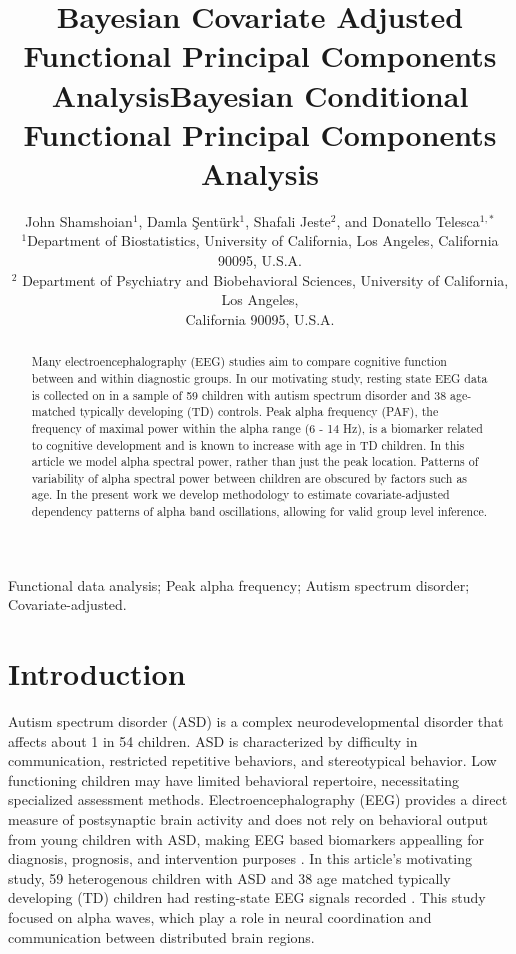 \documentclass[useAMS,usenatbib]{biom}
\title[This is an Example of Recto Running Head]{Bayesian Covariate Adjusted Functional Principal Components Analysis}
\author{John Shamshoian$^{1}$\email{donatello.telesca@ucla.edu}, Damla {\c S}ent{\"u}rk$^{1}$, Shafali Jeste$^{2}$, and Donatello Telesca$^{1,*}$ \\$^{1}$Department of Biostatistics, University of California, Los Angeles, California 90095, U.S.A.\\$^{2}$ Department of Psychiatry and Biobehavioral Sciences, University of California, Los Angeles,\\ California 90095, U.S.A.}
\title[Bayesian Conditional Functional Principal Components Analysis]{Bayesian Conditional Functional Principal Components Analysis}
\begin{document}
	

\label{firstpage}


\begin{abstract}
	Many electroencephalography (EEG) studies aim to compare cognitive function between and within diagnostic groups. In our motivating study, resting state EEG data is collected on in a sample of 59 children with autism spectrum disorder and 38 age-matched typically developing (TD) controls. Peak alpha frequency (PAF), the frequency of maximal power within the alpha range (6 - 14 Hz), is a biomarker related to cognitive development and is known to increase with age in TD children. In this article we model alpha spectral power, rather than just the peak location. Patterns of variability of alpha spectral power between children are obscured by factors such as age. In the present work we develop methodology to estimate covariate-adjusted dependency patterns of alpha band oscillations, allowing for valid group level inference.  
\end{abstract}

%

\begin{keywords}
	Functional data analysis; Peak alpha frequency; Autism spectrum disorder; Covariate-adjusted.
\end{keywords}


\maketitle


\section{Introduction}
\label{s:intro}
Autism spectrum disorder (ASD) is a complex neurodevelopmental disorder that affects about 1 in 54 children. ASD is characterized by difficulty in communication, restricted repetitive behaviors, and stereotypical behavior. Low functioning children may have limited behavioral repertoire, necessitating specialized assessment methods. Electroencephalography (EEG) provides a direct measure of postsynaptic brain activity and does not rely on behavioral output from young children with ASD, making EEG based biomarkers appealling for diagnosis, prognosis, and intervention purposes \citep*{Jeste2015}. In this article's motivating study, 59 heterogenous children with ASD and 38 age matched typically developing (TD) children had resting-state EEG signals recorded \citep*{Dickinson2017}. This study focused on alpha waves, which play a role in neural coordination and communication between distributed brain regions.
\end{document}

